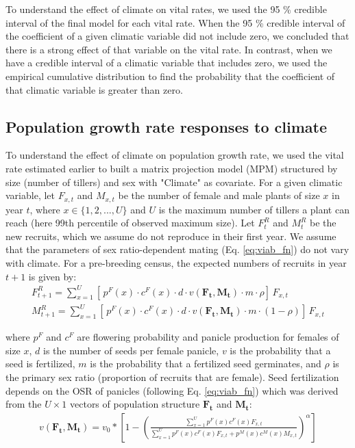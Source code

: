\documentclass[11pt]{article}
\begin{document}
{To understand the effect of climate on vital rates, we used the 95 \% credible interval of the final model for each vital rate. When the 95 \% credible interval of the coefficient of a given climatic variable did not include zero, we concluded that there is a strong effect of that variable on the vital rate. 
In contrast, when we have a credible interval of a climatic variable that includes zero, we used the empirical cumulative distribution to find the probability that the coefficient of that climatic variable is greater than zero.


\subsection*{Population growth rate responses to climate}
To understand the effect of climate on population growth rate, we used the vital rate estimated earlier to built a matrix projection model (MPM) structured by size (number of tillers) and sex with "Climate" as covariate.  
For a given climatic variable, let $F_{x,t}$ and $M_{x,t}$ be the number of female and male plants of size $x$ in year $t$, where $x \in \{1,2,...,U\}$ and $U$ is the maximum number of tillers a plant can reach (here 99th percentile of observed maximum size). 
Let $F^{R}_{t}$ and $M^{R}_{t}$ be the new recruits, which we assume do not reproduce in their first year.
We assume that the parameters of sex ratio-dependent mating (Eq. \ref{eq:viab_fn}) do not vary with climate.  
For a pre-breeding census, the expected numbers of recruits in year $t+1$ is given by:
\begin{align}\label{eq:recruits}
F^{R}_{t+1} = \sum_{x=1}^{U} 	[ \, p^{F}(x) \cdot c^{F}(x) \cdot d \cdot v(\mathbf{F_{t}},\mathbf{M_{t}}) \cdot m \cdot \rho 	] \, F_{x,t}
\\
M^{R}_{t+1} = \sum_{x=1}^{U} 	[ \, p^{F}(x) \cdot c^{F}(x) \cdot d \cdot v(\mathbf{F_{t}},\mathbf{M_{t}}) \cdot m \cdot (1-\rho) 	] \, F_{x,t}
\end{align}

\noindent where $p^{F}$ and $c^{F}$ are flowering probability and panicle production for females of size $x$, $d$ is the number of seeds per female panicle, $v$ is the probability that a seed is fertilized, $m$ is the probability that a fertilized seed germinates, and $\rho$ is the primary sex ratio (proportion of recruits that are female). 
Seed fertilization depends on the OSR of panicles (following Eq. \ref{eq:viab_fn}) which was derived from the $U \times 1$ vectors of population structure $\mathbf{F_{t}}$ and $\mathbf{M_{t}}$:
\begin{align}\label{eq:viab_MPM}
v(\mathbf{F_{t}},\mathbf{M_{t}}) = v_{0} * \left[ 1 - \left( \frac{\sum_{x=1}^{U} p^{F}(x) c^{F}(x) F_{x,t}}{\sum_{x=1}^{U} p^{F}(x) c^{F}(x) F_{x,t} + p^{M}(x) c^{M}(x) M_{x,t}} \right) ^{\alpha}\right]
\end{align}

}
\end{document}
